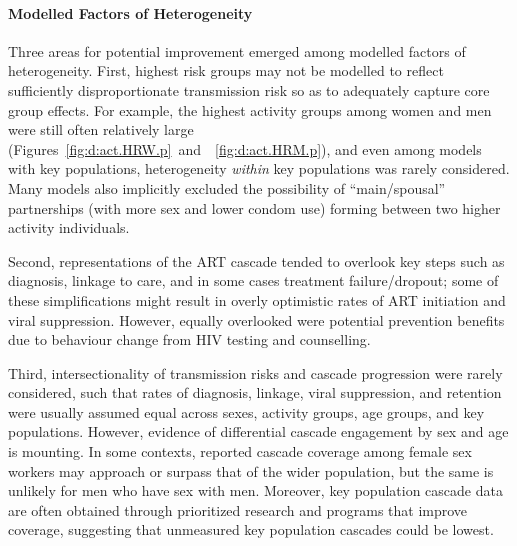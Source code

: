 \paragraph{Modelled Factors of Heterogeneity}
Three areas for potential improvement emerged among modelled factors of heterogeneity.
First, highest risk groups may not be modelled to reflect
sufficiently disproportionate transmission risk so as to adequately
capture core group effects.
For example, the highest activity groups among women and men were still often relatively large
(Figures~\ref{fig:d:act.HRW.p}~and~~\ref{fig:d:act.HRM.p}),
and even among models with key populations,
heterogeneity \emph{within} key populations was rarely considered.
Many models also implicitly excluded the possibility of
``main/spousal'' partnerships (with more sex and lower condom use)
forming between two higher activity individuals.
\par
Second, representations of the ART cascade tended to overlook
key steps such as diagnosis, linkage to care, and in some cases treatment failure/dropout;
\cite{Mountain2014a}
some of these simplifications might result in
overly optimistic rates of ART initiation and viral suppression.
However, equally overlooked were potential prevention benefits
due to behaviour change from HIV testing and counselling.
\par
Third, intersectionality of transmission risks and cascade progression were rarely considered,
such that rates of diagnosis, linkage, viral suppression, and retention
were usually assumed equal across sexes, activity groups, age groups, and key populations.
However, evidence of differential cascade engagement by sex and age is mounting.
\cite{Witzel2017,Mayanja2018,Green2020}
In some contexts, reported cascade coverage among female sex workers
may approach or surpass that of the wider population,\cite{Mountain2014,Hakim2018}
but the same is unlikely for men who have sex with men.\cite{Mountain2014,Stannah2019}
Moreover, key population cascade data are often obtained through
prioritized research and programs that improve coverage,
suggesting that unmeasured key population cascades could be lowest.\cite{Mountain2014}
